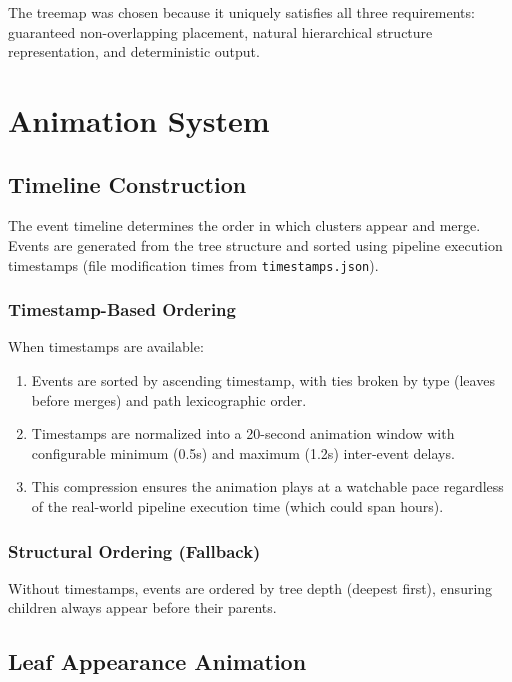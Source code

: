 \documentclass[11pt, letterpaper]{article}
\begin{document}
The treemap was chosen because it uniquely satisfies all three requirements: guaranteed non-overlapping placement, natural hierarchical structure representation, and deterministic output.

\section{Animation System}

\subsection{Timeline Construction}

The event timeline determines the order in which clusters appear and merge. Events are generated from the tree structure and sorted using pipeline execution timestamps (file modification times from \texttt{timestamps.json}).

\subsubsection{Timestamp-Based Ordering}

When timestamps are available:
\begin{enumerate}
    \item Events are sorted by ascending timestamp, with ties broken by type (leaves before merges) and path lexicographic order.
    \item Timestamps are normalized into a 20-second animation window with configurable minimum (0.5s) and maximum (1.2s) inter-event delays.
    \item This compression ensures the animation plays at a watchable pace regardless of the real-world pipeline execution time (which could span hours).
\end{enumerate}

\subsubsection{Structural Ordering (Fallback)}

Without timestamps, events are ordered by tree depth (deepest first), ensuring children always appear before their parents.

\subsection{Leaf Appearance Animation}
\end{document}
